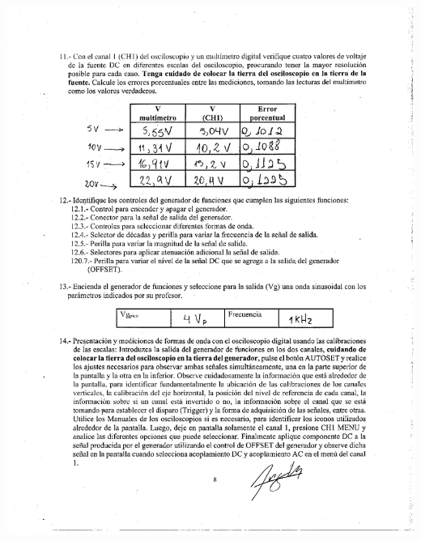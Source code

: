 \documentclass[12pt]{article}
\begin{document}
	\begin{center}
		\includegraphics[width=16cm,height=20cm]{Img/anex_lab_4_0004}
	\end{center}
	
\end{document}

